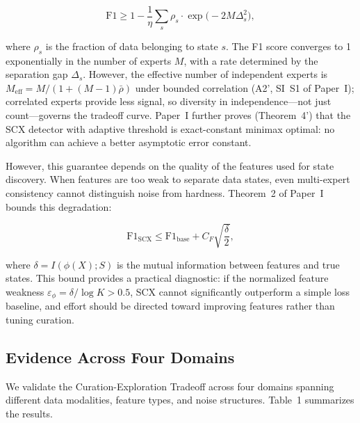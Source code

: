 \begin{equation}
\mathrm{F1} \geq 1 - \frac{1}{\eta} \sum_{s} \rho_s \cdot \exp\!\bigl(-2M\Delta_s^2\bigr),
\end{equation}

where $\rho_s$ is the fraction of data belonging to state $s$. The F1 score converges to 1 exponentially in the number of experts $M$, with a rate determined by the separation gap $\Delta_s$. However, the effective number of independent experts is $M_{\text{eff}} = M/(1+(M-1)\bar{\rho})$ under bounded correlation (A2', SI~S1 of Paper~I); correlated experts provide less signal, so diversity in independence---not just count---governs the tradeoff curve. Paper~I further proves (Theorem~4') that the SCX detector with adaptive threshold is exact-constant minimax optimal: no algorithm can achieve a better asymptotic error constant.

However, this guarantee depends on the quality of the features used for state discovery. When features are too weak to separate data states, even multi-expert consistency cannot distinguish noise from hardness. Theorem~2 of Paper~I bounds this degradation:

\begin{equation}
\mathrm{F1}_{\mathrm{SCX}} \leq \mathrm{F1}_{\mathrm{base}} + C_F \sqrt{\frac{\delta}{2}},
\end{equation}

where $\delta = I(\phi(X); S)$ is the mutual information between features and true states. This bound provides a practical diagnostic: if the normalized feature weakness $\varepsilon_\phi = \delta / \log K > 0.5$, SCX cannot significantly outperform a simple loss baseline, and effort should be directed toward improving features rather than tuning curation.

\subsection{Evidence Across Four Domains}

We validate the Curation-Exploration Tradeoff across four domains spanning different data modalities, feature types, and noise structures. Table~1 summarizes the results.

